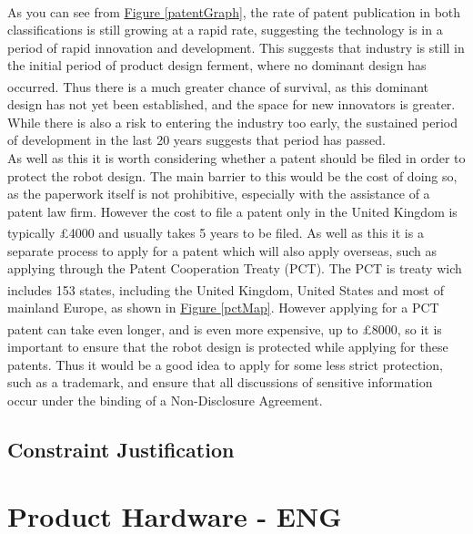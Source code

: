 \documentclass[11pt]{article}		%
\newcommand{\supercite}[1]{\textsuperscript{\cite{#1}}}		%
\newcommand{\figref}[1]{\hyperref[#1]{Figure \ref*{#1}}}    %
\begin{document}
		\\
		As you can see from \figref{patentGraph}, the rate of patent publication in both classifications is still growing at a rapid rate, suggesting the technology is in a period of rapid innovation and development.
		This suggests that industry is still in the initial period of product design ferment, where no dominant design has occurred\supercite{christensen1998innovation}.
		Thus there is a much greater chance of survival, as this dominant design has not yet been established, and the space for new innovators is greater.
		While there is also a risk to entering the industry too early, the sustained period of development in the last 20 years suggests that period has passed.
		\\
		As well as this it is worth considering whether a patent should be filed in order to protect the robot design.
		The main barrier to this would be the cost of doing so, as the paperwork itself is not prohibitive, especially with the assistance of a patent law firm.
		However the cost to file a patent only in the United Kingdom is typically £4000 and usually takes 5 years to be filed\supercite{uk2020patenting}.
		As well as this it is a separate process to apply for a patent which will also apply overseas, such as applying through the Patent Cooperation Treaty (PCT).
		The PCT is treaty wich includes 153 states\supercite{pct2020states}, including the United Kingdom, United States and most of mainland Europe, as shown in \figref{pctMap}.
		However applying for a PCT patent can take even longer, and is even more expensive, up to £8000\supercite{mewburn2020international}, so it is important to ensure that the robot design is protected while applying for these patents.
		Thus it would be a good idea to apply for some less strict protection, such as a trademark, and ensure that all discussions of sensitive information occur under the binding of a Non-Disclosure Agreement.
		
	\subsection[Constraint Justification]{Constraint Justification}
		
	
	\section{Product Hardware - ENG}
	
\end{document}
